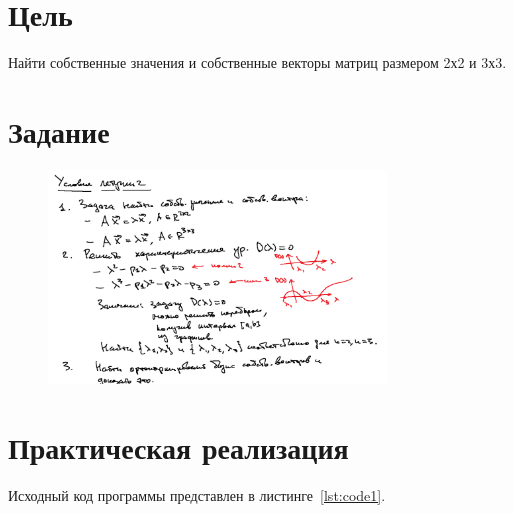 \documentclass[a4paper, 14pt]{extarticle}
\begin{document}
\renewcommand{\ttdefault}{pcr}

\setlength{\tabcolsep}{3pt}
\newpage
\setcounter{page}{2}

\section{Цель}\label{Sect::goal}

Найти собственные значения и собственные векторы матриц размером 2х2 и 3х3.

\section{Задание}\label{Sect::task}

\begin{figure}[!htb]
	\centering
	\includegraphics[width=0.8\textwidth]{img5}
\label{fig:img5}
\end{figure}

\section{Практическая реализация}\label{Sect::code}

Исходный код программы представлен в листинге~\ref{lst:code1}.
\end{document}
